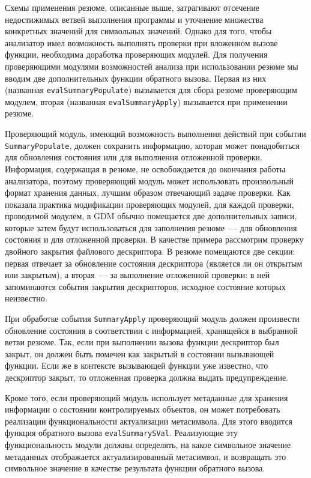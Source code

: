 Схемы применения резюме, описанные выше, затрагивают отсечение недостижимых ветвей выполнения программы и уточнение множества конкретных значений для символьных значений. Однако для того, чтобы анализатор имел возможность выполнять проверки при вложенном вызове функции, необходима доработка проверяющих модулей. Для получения проверяющими модулями возможностей анализа при использовании резюме мы вводим две дополнительных функции обратного вызова. Первая из них (названная \texttt{evalSummaryPopulate}) вызывается для сбора резюме проверяющим модулем, вторая (названная \texttt{evalSummaryApply}) вызывается при применении резюме.

Проверяющий модуль, имеющий возможность выполнения действий при событии \texttt{SummaryPopulate}, должен сохранить информацию, которая может понадобиться для обновления состояния или для выполнения отложенной проверки. Информация, содержащая в резюме, не освобождается до окончания работы анализатора, поэтому проверяющий модуль может использовать произвольный формат хранения данных, лучшим образом отвечающий задаче проверки. Как показала практика модификации проверяющих модулей, для каждой проверки, проводимой модулем, в GDM обычно помещается две дополнительных записи, которые затем будут использоваться для заполнения резюме~--- для обновления состояния и для отложенной проверки. В качестве примера рассмотрим проверку двойного закрытия файлового дескриптора. В резюме помещаются две секции: первая отвечает за обновление состояния дескриптора (является ли он открытым или закрытым), а вторая~--- за выполнение отложенной проверки: в ней запоминаются события закрытия дескрипторов, исходное состояние которых неизвестно.

При обработке события \texttt{SummaryApply} проверяющий модуль должен произвести обновление состояния в соответствии с информацией, хранящейся в выбранной ветви резюме. Так, если при выполнении вызова функции дескриптор был закрыт, он должен быть помечен как закрытый в состоянии вызывающей функции. Если же в контексте вызывающей функции уже известно, что дескриптор закрыт, то отложенная проверка должна выдать предупреждение.

Кроме того, если проверяющий модуль использует метаданные для хранения информации о состоянии контролируемых объектов, он может потребовать реализации функциональности актуализации метасимвола. Для этого вводится функция обратного вызова \texttt{evalSummarySVal}. Реализующие эту функциональность модули должны определять, на какое символьное значение метаданных отображается актуализированный метасимвол, и возвращать это символьное значение в качестве результата функции обратного вызова.

